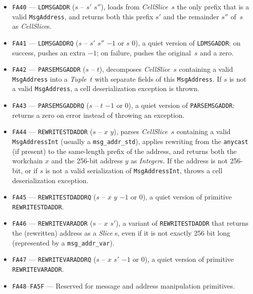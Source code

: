 \documentclass[12pt,oneside]{article}
\begin{document}
\begin{itemize}
\item {\tt FA40} --- {\tt LDMSGADDR} ($s$ -- $s'$ $s''$), loads from {\em CellSlice\/}~$s$ the only prefix that is a valid {\tt MsgAddress}, and returns both this prefix $s'$ and the remainder $s''$ of~$s$ as {\em CellSlice\/}s.
\item {\tt FA41} --- {\tt LDMSGADDRQ} ($s$ -- $s'$ $s''$ $-1$ or $s$ $0$), a quiet version of {\tt LDMSGADDR}: on success, pushes an extra $-1$; on failure, pushes the original~$s$ and a zero.
\item {\tt FA42} --- {\tt PARSEMSGADDR} ($s$ -- $t$), decomposes {\em CellSlice\/}~$s$ containing a valid {\tt MsgAddress} into a {\em Tuple\/}~$t$ with separate fields of this {\tt MsgAddress}. If $s$ is not a valid {\tt MsgAddress}, a cell deserialization exception is thrown.
\item {\tt FA43} --- {\tt PARSEMSGADDRQ} ($s$ -- $t$ $-1$ or $0$), a quiet version of {\tt PARSEMSGADDR}: returns a zero on error instead of throwing an exception.
\item {\tt FA44} --- {\tt REWRITESTDADDR} ($s$ -- $x$ $y$), parses {\em CellSlice\/}~$s$ containing a valid {\tt MsgAddressInt} (usually a {\tt msg\_addr\_std}), applies rewriting from the {\tt anycast} (if present) to the same-length prefix of the address, and returns both the workchain $x$ and the 256-bit address $y$ as {\em Integer\/}s. If the address is not 256-bit, or if $s$ is not a valid serialization of {\tt MsgAddressInt}, throws a cell deserialization exception.
\item {\tt FA45} --- {\tt REWRITESTDADDRQ} ($s$ -- $x$ $y$ $-1$ or $0$), a quiet version of primitive {\tt REWRITESTDADDR}.
\item {\tt FA46} --- {\tt REWRITEVARADDR} ($s$ -- $x$ $s'$), a variant of {\tt REWRITESTDADDR} that returns the (rewritten) address as a {\em Slice\/} s, even if it is not exactly 256 bit long (represented by a {\tt msg\_addr\_var}).
\item {\tt FA47} --- {\tt REWRITEVARADDRQ} ($s$ -- $x$ $s'$ $-1$ or $0$), a quiet version of primitive {\tt REWRITEVARADDR}.
\item {\tt FA48}--{\tt FA5F} --- Reserved for message and address manipulation primitives.
\end{itemize}
\end{document}
